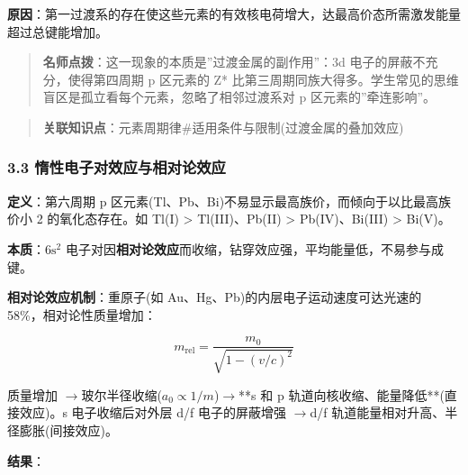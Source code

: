 \documentclass[a4paper,11pt]{ctexart}
\newcommand{\箭}{\ensuremath{\rightarrow}}
\newcommand{\左箭}{\ensuremath{\leftarrow}}
\newcommand{\上箭}{\ensuremath{\uparrow}}
\newcommand{\下箭}{\ensuremath{\downarrow}}
\newcommand{\衡}{\ensuremath{\rightleftharpoons}}
\newcommand{\双箭}{\ensuremath{\leftrightarrow}}
\newcommand{\约等于}{\ensuremath{\approx}}
\newcommand{\小于等于}{\ensuremath{\leq}}
\newcommand{\大于等于}{\ensuremath{\geq}}
\newcommand{\不等于}{\ensuremath{\neq}}
\newcommand{\西格马}{\ensuremath{\sigma}}
\newcommand{\派}{\ensuremath{\pi}}
\begin{document}
\textbf{原因}：第一过渡系的存在使这些元素的有效核电荷增大，达最高价态所需激发能量超过总键能增加。

\begin{quote}
\textbf{名师点拨}：这一现象的本质是''过渡金属的副作用''：3d 电子的屏蔽不充分，使得第四周期 p 区元素的 Z* 比第三周期同族大得多。学生常见的思维盲区是孤立看每个元素，忽略了相邻过渡系对 p 区元素的''牵连影响''。
\end{quote}

\begin{quote}
\textbf{关联知识点}：元素周期律\#适用条件与限制(过渡金属的叠加效应)
\end{quote}

\subsubsection{3.3 惰性电子对效应与相对论效应}\label{ux60f0ux6027ux7535ux5b50ux5bf9ux6548ux5e94ux4e0eux76f8ux5bf9ux8bbaux6548ux5e94}

\textbf{定义}：第六周期 p 区元素(Tl、Pb、Bi)不易显示最高族价，而倾向于以比最高族价小 2 的氧化态存在。如 Tl(I) \textgreater{} Tl(III)、Pb(II) \textgreater{} Pb(IV)、Bi(III) \textgreater{} Bi(V)。

\textbf{本质}：\(6\mathrm{s}^2\) 电子对因\textbf{相对论效应}而收缩，钻穿效应强，平均能量低，不易参与成键。

\textbf{相对论效应机制}：重原子(如 Au、Hg、Pb)的内层电子运动速度可达光速的 58\%，相对论性质量增加：

\[m_{\text{rel}} = \frac{m_0}{\sqrt{1-(v/c)^2}}\]

质量增加 \箭 玻尔半径收缩(\(a_0 \propto 1/m\))\箭 **s 和 p 轨道向核收缩、能量降低**(直接效应)。s 电子收缩后对外层 d/f 电子的屏蔽增强 \箭 d/f 轨道能量相对升高、半径膨胀(间接效应)。

\textbf{结果}：
\end{document}
